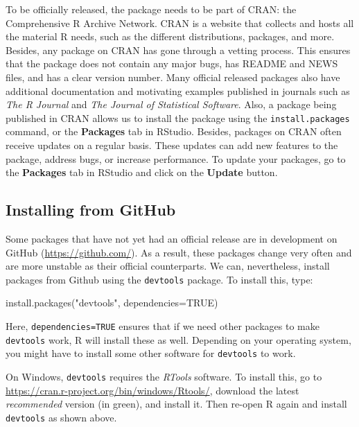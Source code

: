 \documentclass[
]{book}
\newenvironment{Shaded}{\begin{snugshade}}{\end{snugshade}}
\newcommand{\AttributeTok}[1]{\textcolor[rgb]{0.77,0.63,0.00}{#1}}
\newcommand{\ConstantTok}[1]{\textcolor[rgb]{0.00,0.00,0.00}{#1}}
\newcommand{\FunctionTok}[1]{\textcolor[rgb]{0.00,0.00,0.00}{#1}}
\newcommand{\NormalTok}[1]{#1}
\newcommand{\StringTok}[1]{\textcolor[rgb]{0.31,0.60,0.02}{#1}}
\begin{document}
To be officially released, the package needs to be part of CRAN: the Comprehensive R Archive Network. CRAN is a website that collects and hosts all the material R needs, such as the different distributions, packages, and more. Besides, any package on CRAN has gone through a vetting process. This ensures that the package does not contain any major bugs, has README and NEWS files, and has a clear version number. Many official released packages also have additional documentation and motivating examples published in journals such as \emph{The R Journal} and \emph{The Journal of Statistical Software}. Also, a package being published in CRAN allows us to install the package using the \texttt{install.packages} command, or the \textbf{Packages} tab in RStudio. Besides, packages on CRAN often receive updates on a regular basis. These updates can add new features to the package, address bugs, or increase performance. To update your packages, go to the \textbf{Packages} tab in RStudio and click on the \textbf{Update} button.

\hypertarget{installing-from-github}{%
\subsection{Installing from GitHub}\label{installing-from-github}}

Some packages that have not yet had an official release are in development on GitHub (\url{https://github.com/}). As a result, these packages change very often and are more unstable as their official counterparts. We can, nevertheless, install packages from Github using the \texttt{devtools} package. To install this, type:

\begin{Shaded}
\begin{Highlighting}[]
\FunctionTok{install.packages}\NormalTok{(}\StringTok{"devtools"}\NormalTok{, }\AttributeTok{dependencies=}\ConstantTok{TRUE}\NormalTok{)}
\end{Highlighting}
\end{Shaded}

Here, \texttt{dependencies=TRUE} ensures that if we need other packages to make \texttt{devtools} work, R will install these as well. Depending on your operating system, you might have to install some other software for \texttt{devtools} to work.

On Windows, \texttt{devtools} requires the \emph{RTools} software. To install this, go to \url{https://cran.r-project.org/bin/windows/Rtools/}, download the latest \emph{recommended} version (in green), and install it. Then re-open R again and install \texttt{devtools} as shown above.
\end{document}
